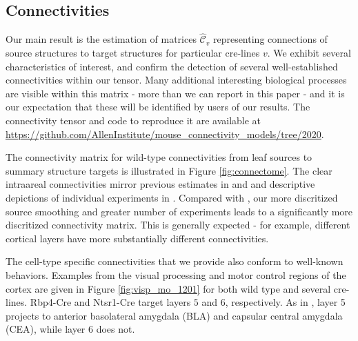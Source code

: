 \newpage

\subsection{Connectivities}

Our main result is the estimation of matrices $\hat {\mathcal C}_v$ representing connections of source structures to target structures for particular cre-lines $v$. 
We exhibit several characteristics of interest, and confirm the detection of several well-established connectivities within our tensor.
Many additional interesting biological processes are visible within this matrix - more than we can report in this paper - and it is our expectation that these will be identified by users of our results.
The connectivity tensor and code to reproduce it are available at \url{https://github.com/AllenInstitute/mouse_connectivity_models/tree/2020}.

The connectivity matrix for wild-type connectivities from leaf sources to summary structure targets is illustrated in Figure \ref{fig:connectome}.
The clear intraareal connectivities mirror previous estimates in \citet{Oh2014-kh} and \citet{Knox2019-ot} and descriptive depictions of individual experiments in \citet{Harris2019-mr}.
Compared with \citet{Knox2019-ot}, our more discritized source smoothing and greater number of experiments leads to a significantly more discritized connectivity matrix.
This is generally expected - for example, different cortical layers have more substantially different connectivities.

The cell-type specific connectivities that we provide also conform to well-known behaviors.
Examples from the visual processing and motor control regions of the cortex are given in Figure \ref{fig:visp_mo_1201} for both wild type and several cre-lines.
Rbp4-Cre and Ntsr1-Cre target layers $5$ and $6$, respectively. As in \citet{Jeong2016-dc}, layer 5 projects to anterior basolateral amygdala (BLA) and capsular central amygdala (CEA), while layer 6 does not.

\newpage

